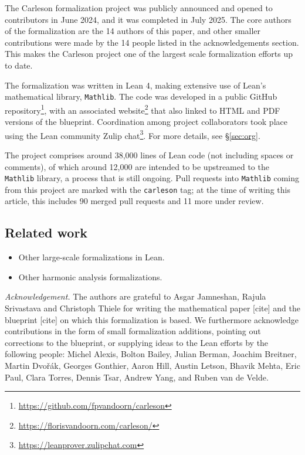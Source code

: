 \documentclass[12pt]{amsart}
\newcommand{\lean}[1]{\texttt{#1}}
\newcommand{\mathlib}{\texttt{Mathlib}\xspace}
\begin{document}
The Carleson formalization project was publicly announced and opened to contributors in June 2024, and it was completed in July 2025. The core authors of the formalization are the 14 authors of this paper, and other smaller contributions were made by the 14 people listed in the acknowledgements section. This makes the Carleson project one of the largest scale formalization efforts up to date.

The formalization was written in Lean 4, making extensive use of Lean's mathematical library, \mathlib. The code was developed in a public GitHub repository\footnote{\url{https://github.com/fpvandoorn/carleson}}, with an associated website\footnote{\url{https://florisvandoorn.com/carleson/}} that also linked to HTML and PDF versions of the blueprint. Coordination among project collaborators took place using the Lean community Zulip chat\footnote{\url{https://leanprover.zulipchat.com}}. For more details, see \S\ref{sec:org}.

The project comprises around 38,000 lines of Lean code (not including spaces or comments), of which around 12,000 are intended to be upstreamed to the \mathlib library, a process that is still ongoing. Pull requests into \mathlib coming from this project are marked with the \lean{carleson} tag; at the time of writing this article, this includes 90 merged pull requests and 11 more under review.

\subsection{Related work}\label{subsec:rel_work}
\begin{itemize}
 	\item Other large-scale formalizations in Lean.
	\item Other harmonic analysis formalizations.
\end{itemize}

\noindent \textit{Acknowledgement.}
The authors are grateful to Asgar Jamneshan, Rajula Srivastava and Christoph Thiele for writing the mathematical paper [cite] and the blueprint [cite] on which this formalization is based.
We furthermore acknowledge contributions in the form of small formalization additions,
pointing out corrections to the blueprint,
or supplying ideas to the Lean efforts by the following people:
Michel Alexis,
Bolton Bailey,
Julian Berman,
Joachim Breitner,
Martin Dvořák,
Georges Gonthier,
Aaron Hill,
Austin Letson,
Bhavik Mehta,
Eric Paul,
Clara Torres,
Dennis Tsar,
Andrew Yang, and
Ruben van de Velde.
\end{document}
